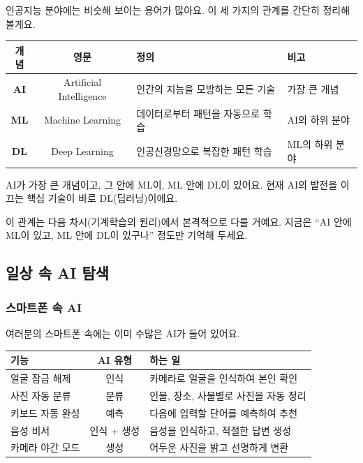 \documentclass[11pt,a4paper]{article}
\begin{document}
인공지능 분야에는 비슷해 보이는 용어가 많아요. 이 세 가지의 관계를 간단히 정리해 볼게요.

\begin{center}
\begin{tabular}{|c|c|p{5cm}|p{3.5cm}|}
\hline
\rowcolor{tableheader}
\textbf{개념} & \textbf{영문} & \textbf{정의} & \textbf{비고} \\
\hline
\textbf{AI} & Artificial Intelligence & 인간의 지능을 모방하는 모든 기술 & 가장 큰 개념 \\
\hline
\textbf{ML} & Machine Learning & 데이터로부터 패턴을 자동으로 학습 & AI의 하위 분야 \\
\hline
\textbf{DL} & Deep Learning & 인공신경망으로 복잡한 패턴 학습 & ML의 하위 분야 \\
\hline
\end{tabular}
\end{center}

\begin{definitionbox}
AI가 가장 큰 개념이고, 그 안에 ML이, ML 안에 DL이 있어요. 현재 AI의 발전을 이끄는 핵심 기술이 바로 DL(딥러닝)이에요.
\end{definitionbox}

이 관계는 다음 차시(기계학습의 원리)에서 본격적으로 다룰 거예요. 지금은 ``AI 안에 ML이 있고, ML 안에 DL이 있구나'' 정도만 기억해 두세요.



\subsection{일상 속 AI 탐색}

\subsubsection{스마트폰 속 AI}

여러분의 스마트폰 속에는 이미 수많은 AI가 들어 있어요.

\begin{center}
\begin{tabular}{|p{4cm}|c|p{6.5cm}|}
\hline
\rowcolor{tableheader}
\textbf{기능} & \textbf{AI 유형} & \textbf{하는 일} \\
\hline
얼굴 잠금 해제 & 인식 & 카메라로 얼굴을 인식하여 본인 확인 \\
\hline
사진 자동 분류 & 분류 & 인물, 장소, 사물별로 사진을 자동 정리 \\
\hline
키보드 자동 완성 & 예측 & 다음에 입력할 단어를 예측하여 추천 \\
\hline
음성 비서 & 인식 + 생성 & 음성을 인식하고, 적절한 답변 생성 \\
\hline
카메라 야간 모드 & 생성 & 어두운 사진을 밝고 선명하게 변환 \\
\hline
\end{tabular}
\end{center}
\end{document}
